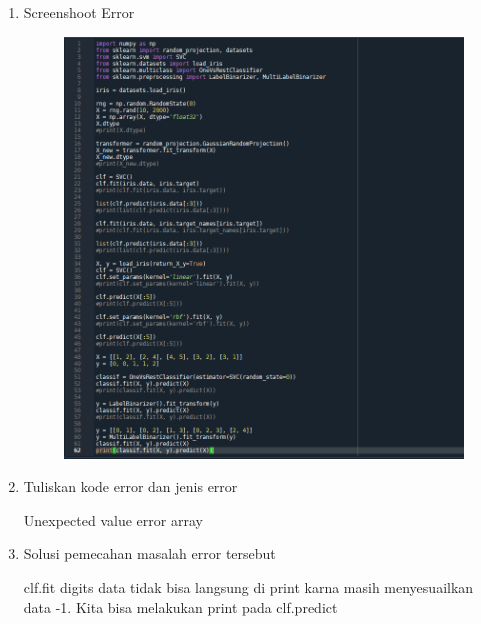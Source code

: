 \begin{enumerate}
	\item Screenshoot Error
	\begin{figure}[!htbp]
		\centering
		\includegraphics[scale=0.6]{figures/5.PNG}
	\end{figure}
	
	\newpage    
	\item Tuliskan kode error dan jenis error
	\par 
	Unexpected value error array
	\par

	
	\item
	Solusi pemecahan masalah error tersebut
	\par
	clf.fit digits data tidak bisa langsung di print karna masih menyesuailkan data -1. Kita bisa melakukan print pada clf.predict
	
\end{enumerate}

